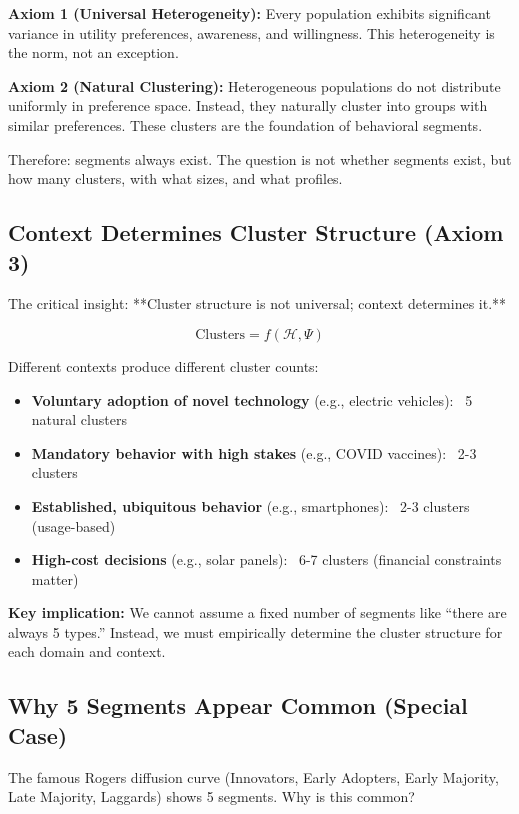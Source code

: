 \textbf{Axiom 1 (Universal Heterogeneity):} Every population exhibits significant
variance in utility preferences, awareness, and willingness. This heterogeneity
is the norm, not an exception.

\textbf{Axiom 2 (Natural Clustering):} Heterogeneous populations do not distribute
uniformly in preference space. Instead, they naturally cluster into groups with
similar preferences. These clusters are the foundation of behavioral segments.

Therefore: segments always exist. The question is not whether segments exist, but
how many clusters, with what sizes, and what profiles.

\subsection{Context Determines Cluster Structure (Axiom 3)}

The critical insight: **Cluster structure is not universal; context determines it.**

\begin{equation}
\text{Clusters} = f(\mathcal{H}, \Psi)
\end{equation}

Different contexts produce different cluster counts:

\begin{itemize}
    \item \textbf{Voluntary adoption of novel technology} (e.g., electric vehicles): ~5 natural clusters
    \item \textbf{Mandatory behavior with high stakes} (e.g., COVID vaccines): ~2-3 clusters
    \item \textbf{Established, ubiquitous behavior} (e.g., smartphones): ~2-3 clusters (usage-based)
    \item \textbf{High-cost decisions} (e.g., solar panels): ~6-7 clusters (financial constraints matter)
\end{itemize}

\textbf{Key implication:} We cannot assume a fixed number of segments like ``there are
always 5 types.'' Instead, we must empirically determine the cluster structure for
each domain and context.

\subsection{Why 5 Segments Appear Common (Special Case)}

The famous Rogers diffusion curve (Innovators, Early Adopters, Early Majority, Late
Majority, Laggards) shows 5 segments. Why is this common?

